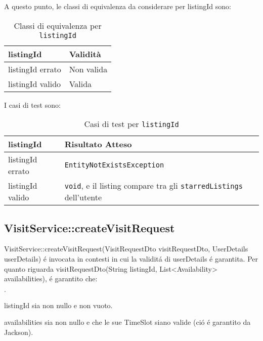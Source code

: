 A questo punto, le classi di equivalenza da considerare per listingId sono:
\begin{table}[h!]
    \centering
    \renewcommand{\arraystretch}{1.4}
    \begin{tabularx}{\textwidth}{|X|X|}
    \hline
    \textbf{listingId} & \textbf{Validità} \\
    \hline
    listingId errato & Non valida \\
    \hline
    listingId valido & Valida \\
    \hline
    \end{tabularx}
    \caption{Classi di equivalenza per \texttt{listingId}}
\end{table}
    
I casi di test sono:
\begin{table}[h!]
    \centering
    \renewcommand{\arraystretch}{1.4}
    \begin{tabularx}{\textwidth}{|X|X|}
    \hline
    \textbf{listingId} & \textbf{Risultato Atteso} \\
    \hline
    listingId errato & \texttt{EntityNotExistsException} \\
    \hline
    listingId valido & \texttt{void}, e il listing compare tra gli \texttt{starredListings} dell’utente \\
    \hline
    \end{tabularx}
    \caption{Casi di test per \texttt{listingId}}
\end{table}

\newpage

    
\subsection{VisitService::createVisitRequest}
VisitService::createVisitRequest(VisitRequestDto visitRequestDto, UserDetails userDetails) 
é invocata in contesti in cui la validitá di userDetails é garantita. 
Per quanto riguarda visitRequestDto(String listingId, List<Availability> availabilities), 
é garantito che:
\begin{list}{$\cdot$}{}
    \item listingId sia non nullo e non vuoto.
    \item availabilities sia non nullo e che le sue TimeSlot siano 
    valide (ció é garantito da Jackson).
\end{list}

